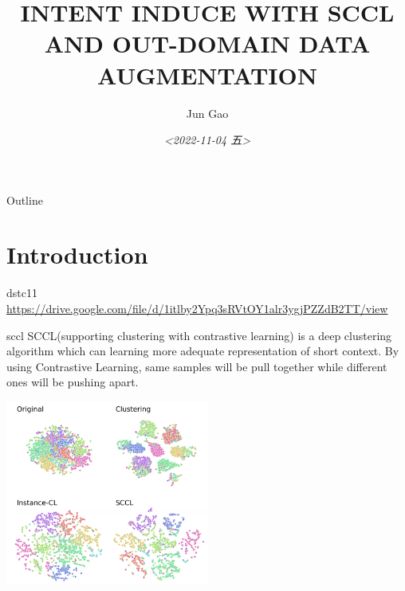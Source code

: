 \documentclass[]{beamer}
\author{Jun Gao}
\date{\textit{<2022-11-04 五>}}
\title{INTENT INDUCE WITH SCCL AND OUT-DOMAIN DATA AUGMENTATION}
\begin{document}
\maketitle
\begin{frame}{Outline}
\tableofcontents
\end{frame}


\section{Introduction}
\label{sec:org231ae39}
\begin{frame}[label={sec:org922540b}]{dstc11}
\url{https://drive.google.com/file/d/1itlby2Ypq3sRVtOY1alr3ygjPZZdB2TT/view}
\end{frame}
\begin{frame}[label={sec:org4641558}]{sccl}
SCCL(supporting clustering with contrastive learning) is a deep clustering algorithm which can learning more adequate representation of short context. By using Contrastive Learning, same samples will be pull together while different ones will be pushing apart.

\begin{center}
\includegraphics[width=0.5\textwidth]{../images/20221104-230515_screenshot.png}
\end{center}
\end{frame}
\end{document}
